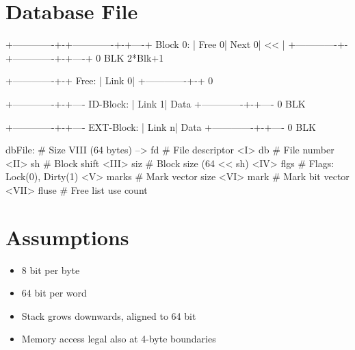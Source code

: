 \section{Database File}
\label{sec:internal-structures-database-file}


\begin{wideverbatim}
            +-------------+-+-------------+-+----+
Block 0:    |   Free       0|   Next       0| << |
            +-------------+-+-------------+-+----+
            0               BLK                  2*Blk+1


            +-------------+-+
Free:       |   Link       0|
            +-------------+-+
            0


            +-------------+-+----
ID-Block:   |   Link       1| Data
            +-------------+-+----
            0              BLK


            +-------------+-+----
EXT-Block:  |   Link       n| Data
            +-------------+-+----
            0              BLK


dbFile:  # Size VIII (64 bytes)
   -->   fd       # File descriptor
   <I>   db       # File number
   <II>  sh       # Block shift
   <III> siz      # Block size (64 << sh)
   <IV>  flgs     # Flags: Lock(0), Dirty(1)
   <V>   marks    # Mark vector size
   <VI>  mark     # Mark bit vector
   <VII> fluse    # Free list use count
\end{wideverbatim}

\pagebreak{}
\section{Assumptions}
\label{sec:internal-structures-assumptions}

\begin{itemize}
\item 8 bit per byte
\item 64 bit per word
\item Stack grows downwards, aligned to 64 bit
\item Memory access legal also at 4-byte boundaries
\end{itemize}

